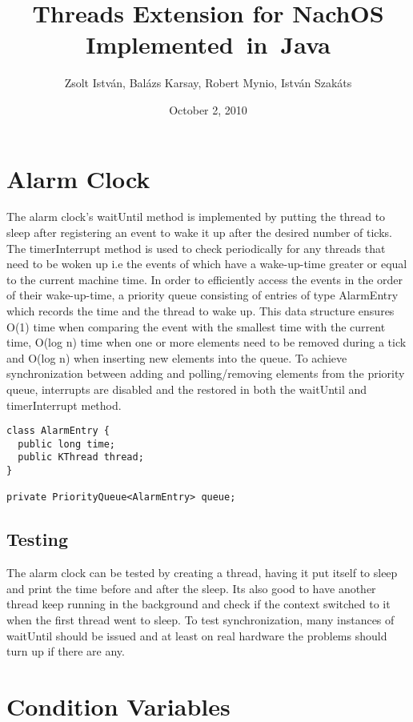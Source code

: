 \documentclass[a4paper,10pt]{article}
\title{Threads Extension for NachOS Implemented~in~Java}
\author{Zsolt Istv\'{a}n, Bal\'{a}zs Karsay, Robert Mynio, Istv\'{a}n Szak\'{a}ts}
\date{October 2, 2010}
\begin{document}
\maketitle

\section{Alarm Clock}
The alarm clock's waitUntil method is implemented by putting the thread to sleep
after registering an event to wake it up after the desired number of ticks.
The timerInterrupt method is used to check periodically for any threads that
need to be woken up i.e the events of which have a wake-up-time greater or equal to the
current machine time. In order to efficiently access the events in the order of
their wake-up-time, a priority queue consisting of entries of type AlarmEntry
which records the time and the thread to wake up. This data structure
ensures O(1) time when comparing the event with the smallest time with the current
time, O(log n) time when one or more elements need to be removed during a tick
and O(log n) when inserting new elements into the queue. To achieve synchronization 
between adding and polling/removing elements from the priority queue, interrupts 
are disabled and the restored in both the waitUntil and timerInterrupt method.

\begin{verbatim}
class AlarmEntry {
  public long time;
  public KThread thread;
}
	
private PriorityQueue<AlarmEntry> queue;
\end{verbatim}

\subsection{Testing}
The alarm clock can be tested by creating a thread, having it put itself to sleep and print
the time before and after the sleep. Its also good to have another thread keep running in the
background and check if the context switched to it when the first thread went to sleep. To
test synchronization, many instances of waitUntil should be issued and at least on real hardware
the problems should turn up if there are any.
\pagebreak
\section{Condition Variables}
\end{document}
